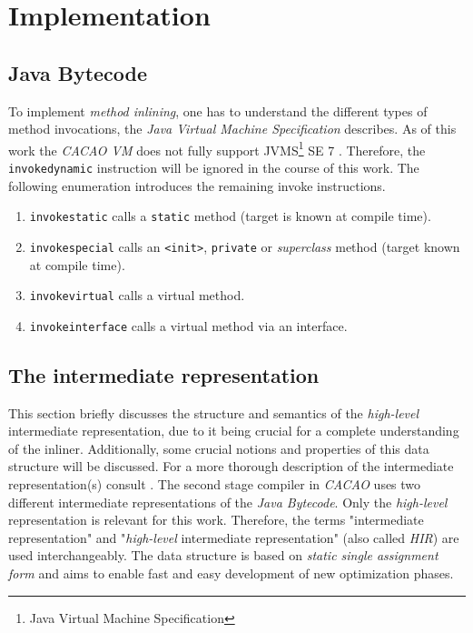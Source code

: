 \documentclass[draft, final]{vutinfth} %
\begin{document}
\chapter{Implementation}

\section{Java Bytecode}

To implement \emph{method inlining}, one has to understand the different types of method invocations, the \emph{Java Virtual Machine Specification} describes. As of this work the \emph{CACAO VM} does not fully support JVMS\footnote{Java Virtual Machine Specification} SE 7 \cite{JVMSpec}. Therefore, the \texttt{invokedynamic} instruction will be ignored in the course of this work. The following enumeration introduces the remaining invoke instructions.

\begin{enumerate}
    \item \texttt{invokestatic} calls a \texttt{static} method (target is known at compile time).
    \item \texttt{invokespecial} calls an \texttt{<init>}, \texttt{private} or \emph{superclass} method (target known at compile time).
    \item \texttt{invokevirtual} calls a virtual method.
    \item \texttt{invokeinterface} calls a virtual method via an interface.
\end{enumerate}

\section{The intermediate representation}
\label{sec:intermediate_representation}

This section briefly discusses the structure and semantics of the \emph{high-level} intermediate representation, due to it being crucial for a complete understanding of the inliner. Additionally, some crucial notions and properties of this data structure will be discussed. For a more thorough description of the intermediate representation(s) consult \cite{Eisl13}. The second stage compiler in \emph{CACAO} uses two different intermediate representations of the \emph{Java Bytecode}. Only the \emph{high-level} representation is relevant for this work. Therefore, the terms "intermediate representation" and "\emph{high-level} intermediate representation" (also called \emph{HIR}) are used interchangeably. The data structure is based on \emph{static single assignment form} and aims to enable fast and easy development of new optimization phases.
\end{document}
